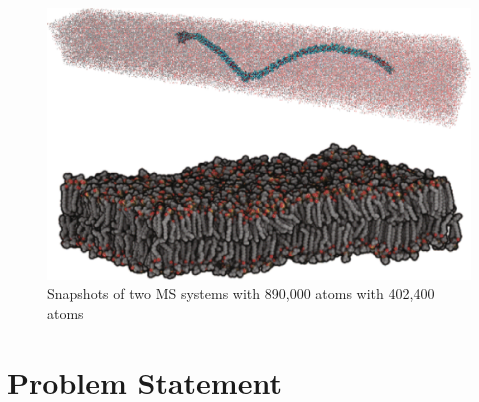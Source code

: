 \documentclass[11pt,a4paper]{report}
\begin{document}
\begin{figure}
 \centerline{ \includegraphics[width=0.5\columnwidth]{images/sample_snapshot_of_simulation.eps} }
 \caption{ Snapshots of two MS systems with 890,000 atoms with 402,400 atoms}
 \label{fg:collagen_dipal}
\end{figure}


\section{Problem Statement}
\end{document}
